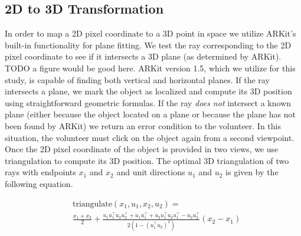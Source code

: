 \documentclass[chi_draft]{sigchi}
\begin{document}
\subsection{2D to 3D Transformation}
In order to map a 2D pixel coordinate to a 3D point in space we utilize ARKit's built-in functionality for plane fitting.  We test the ray corresponding to the 2D pixel coordinate to see if it intersects a 3D plane (as determined by ARKit).  TODO a figure would be good here.  ARKit version 1.5, which we utilize for this study, is capable of finding both vertical and horizontal planes.  If the ray intersects a plane, we mark the object as localized and compute its 3D position using straightforward geometric formulas.  If the ray \emph{does not} intersect a known plane (either because the object located on a plane or because the plane has not been found by ARKit) we return an error condition to the volunteer.  In this situation, the volunteer must click on the object again from a second viewpoint.  Once the 2D pixel coordinate of the object is provided in two views, we use triangulation to compute its 3D position.  The optimal 3D triangulation of two rays with endpoints $x_1$ and $x_2$ and unit directions $u_1$ and $u_2$ is given by the following equation.

\begin{align}
&\mbox{triangulate}(x_1, u_1, x_2, u_2) \nonumber = \\
&\frac{x_1 + x_2}{2}  + \frac{ u_1 u_1^\top u_2 u_2^\top  +  u_1 u_1^\top  + u_2 u_1^\top  u_2 u_1^\top - u_2 u_2^\top }{2 \left (1 -  \left ( u_1^\top u_2 \right)^2\right) } \left(  x_2 - x_1\right) \nonumber
\end{align}


%
\end{document}
